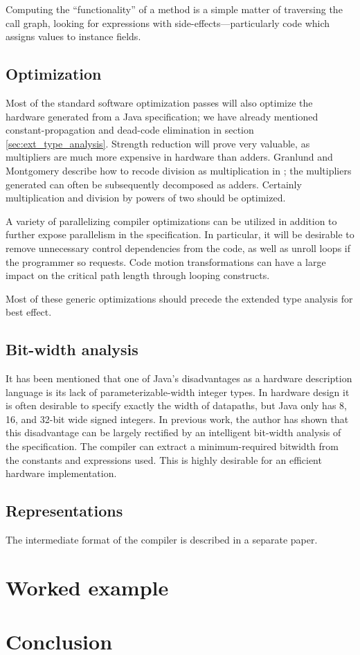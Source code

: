 \documentclass[11pt,notitlepage,twocolumn]{article}
\begin{document}
Computing the ``functionality'' of a method is a simple matter of
traversing the call graph, looking for expressions with
side-effects---particularly code which assigns values to instance
fields.

\subsection{Optimization}
Most of the standard software optimization passes will also optimize
the hardware generated from a Java specification; we have already
mentioned constant-propagation and dead-code elimination in section
\ref{sec:ext_type_analysis}.  Strength reduction will prove very
valuable, as multipliers are much more expensive in hardware than
adders.  Granlund and Montgomery describe how to recode division as
multiplication in \cite{granlund94:divopt}; the multipliers generated
can often be subsequently decomposed as adders.  Certainly
multiplication and division by powers of two should be optimized.

A variety of parallelizing compiler optimizations can be utilized in addition
to further expose parallelism in the specification.  In
particular, it will be desirable to remove unnecessary control
dependencies from the code, as well as unroll loops if the programmer
so requests.  Code motion transformations can have a large impact on
the critical path length through looping constructs.

Most of these generic optimizations should precede the extended type
analysis for best effect.

\subsection{Bit-width analysis}
It has been mentioned that one of Java's disadvantages as a hardware
description language is its lack of parameterizable-width integer
types.  In hardware design it is often desirable to specify exactly
the width of datapaths, but Java only has 8, 16, and 32-bit wide
signed integers.  In previous work, the author has shown that this
disadvantage can be largely rectified by an intelligent bit-width
analysis of the specification.  The compiler can extract
a minimum-required bitwidth from the constants and expressions used.
This is highly desirable for an efficient hardware implementation.

\subsection{Representations}

The intermediate format of the compiler is described in a separate paper.

\section{Worked example}
\section{Conclusion}


\end{document}
